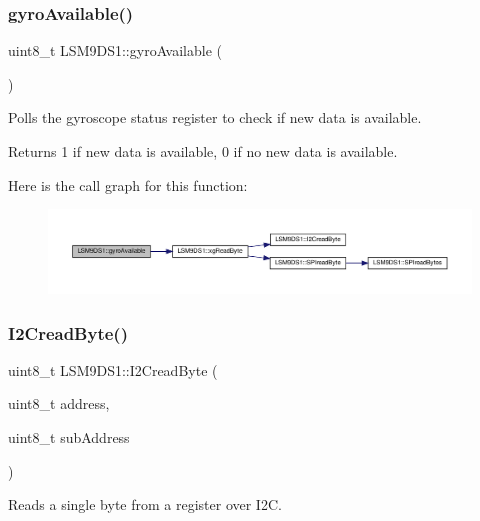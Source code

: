 \subsubsection{\texorpdfstring{gyro\+Available()}{gyroAvailable()}}
{\footnotesize\ttfamily uint8\+\_\+t L\+S\+M9\+D\+S1\+::gyro\+Available (\begin{DoxyParamCaption}{ }\end{DoxyParamCaption})}



Polls the gyroscope status register to check if new data is available. 

\begin{DoxyReturn}{Returns}
1 if new data is available, 0 if no new data is available. 
\end{DoxyReturn}
Here is the call graph for this function\+:\nopagebreak
\begin{figure}[H]
\begin{center}
\leavevmode
\includegraphics[width=350pt]{classLSM9DS1_a65b71a03a30f4e8ed1ffd46de3db0560_cgraph}
\end{center}
\end{figure}
\mbox{\label{classLSM9DS1_a7fc046d4b335494331905fdeb5c81c9e}} 
\subsubsection{\texorpdfstring{I2\+Cread\+Byte()}{I2CreadByte()}}
{\footnotesize\ttfamily uint8\+\_\+t L\+S\+M9\+D\+S1\+::\+I2\+Cread\+Byte (\begin{DoxyParamCaption}\item[{uint8\+\_\+t}]{address,  }\item[{uint8\+\_\+t}]{sub\+Address }\end{DoxyParamCaption})\hspace{0.3cm}{\ttfamily [protected]}}



Reads a single byte from a register over I2C. 


